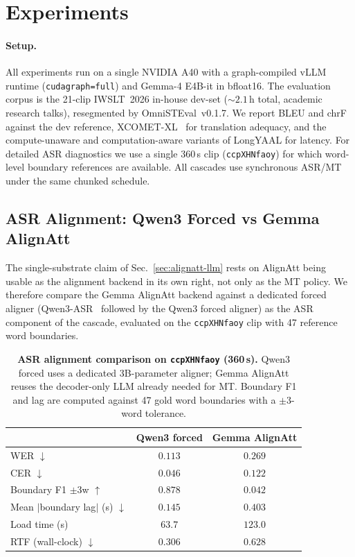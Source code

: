 \documentclass[11pt,twocolumn]{article}
\begin{document}
\section{Experiments}
\label{sec:experiments}

\paragraph{Setup.}
All experiments run on a single NVIDIA A40 with a graph-compiled vLLM
runtime (\texttt{cudagraph=full}) and Gemma-4 E4B-it in bfloat16.
The evaluation corpus is the 21-clip IWSLT~2026 in-house dev-set
(${\sim}2.1$\,h total, academic research talks), resegmented by
OmniSTEval~v0.1.7. We report BLEU and chrF against the dev reference,
XCOMET-XL~\cite{xcometxl23} for translation adequacy, and the
compute-unaware and computation-aware variants of LongYAAL
\cite{longyaal25} for latency. For detailed ASR diagnostics we use a
single 360\,s clip (\texttt{ccpXHNfaoy}) for which word-level boundary
references are available. All cascades use synchronous ASR/MT under the
same chunked schedule.

\subsection{ASR Alignment: Qwen3 Forced vs Gemma AlignAtt}
\label{sec:exp-asr}

The single-substrate claim of Sec.~\ref{sec:alignatt-llm} rests on AlignAtt
being usable as the alignment backend in its own right, not only as the MT
policy. We therefore compare the Gemma AlignAtt backend against a dedicated
forced aligner (Qwen3-ASR~\cite{qwen3asr25} followed by the Qwen3
forced aligner) as the ASR component of the cascade, evaluated on the
\texttt{ccpXHNfaoy} clip with 47 reference word boundaries.

\begin{table}[t]
\centering
\small
\begin{tabular}{lcc}
\toprule
 & Qwen3 forced & Gemma AlignAtt \\
\midrule
WER $\downarrow$                 & $0.113$ & $0.269$ \\
CER $\downarrow$                 & $0.046$ & $0.122$ \\
Boundary F1 $\pm$3w $\uparrow$   & $0.878$ & $0.042$ \\
Mean $|$boundary lag$|$ (s) $\downarrow$ & $0.145$ & $0.403$ \\
Load time (s)                    & $63.7$  & $123.0$ \\
RTF (wall-clock) $\downarrow$    & $0.306$ & $0.628$ \\
\bottomrule
\end{tabular}
\caption{\textbf{ASR alignment comparison on \texttt{ccpXHNfaoy}
(360\,s).} Qwen3 forced uses a dedicated 3B-parameter aligner; Gemma
AlignAtt reuses the decoder-only LLM already needed for MT. Boundary F1
and lag are computed against 47 gold word boundaries with a
$\pm$3-word tolerance.}
\label{tab:asr-compare}
\end{table}
\end{document}
